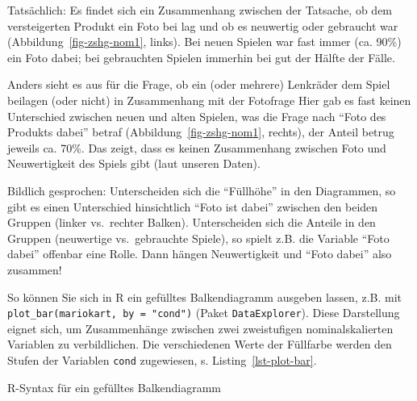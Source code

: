 \documentclass[
  letterpaper,
  twoside,
  open=any]{scrbook}
\newenvironment{Shaded}{\begin{snugshade}}{\end{snugshade}}
\newcommand{\AttributeTok}[1]{\textcolor[rgb]{0.40,0.45,0.13}{#1}}
\newcommand{\CommentTok}[1]{\textcolor[rgb]{0.37,0.37,0.37}{#1}}
\newcommand{\FunctionTok}[1]{\textcolor[rgb]{0.28,0.35,0.67}{#1}}
\newcommand{\NormalTok}[1]{\textcolor[rgb]{0.00,0.23,0.31}{#1}}
\newcommand{\SpecialCharTok}[1]{\textcolor[rgb]{0.37,0.37,0.37}{#1}}
\newcommand{\StringTok}[1]{\textcolor[rgb]{0.13,0.47,0.30}{#1}}
\theoremstyle{definition}
\theoremstyle{definition}
\theoremstyle{definition}
\theoremstyle{remark}
\begin{document}
Tatsächlich: Es findet sich ein Zusammenhang zwischen der Tatsache, ob
dem versteigerten Produkt ein Foto bei lag und ob es neuwertig oder
gebraucht war (Abbildung~\ref{fig-zshg-nom1}, links). Bei neuen Spielen
war fast immer (ca. 90\%) ein Foto dabei; bei gebrauchten Spielen
immerhin bei gut der Hälfte der Fälle.

Anders sieht es aus für die Frage, ob ein (oder mehrere) Lenkräder dem
Spiel beilagen (oder nicht) in Zusammenhang mit der Fotofrage Hier gab
es fast keinen Unterschied zwischen neuen und alten Spielen, was die
Frage nach \enquote{Foto des Produkts dabei} betraf
(Abbildung~\ref{fig-zshg-nom1}, rechts), der Anteil betrug jeweils ca.
70\%. Das zeigt, dass es keinen Zusammenhang zwischen Foto und
Neuwertigkeit des Spiels gibt (laut unseren Daten).

Bildlich gesprochen: Unterscheiden sich die \enquote{Füllhöhe} in den
Diagrammen, so gibt es einen Unterschied hinsichtlich \enquote{Foto ist
dabei} zwischen den beiden Gruppen (linker vs.~rechter Balken).
Unterscheiden sich die Anteile in den Gruppen (neuwertige vs.~gebrauchte
Spiele), so spielt z.B. die Variable \enquote{Foto dabei} offenbar eine
Rolle. Dann hängen Neuwertigkeit und \enquote{Foto dabei} also zusammen!

So können Sie sich in R ein gefülltes Balkendiagramm ausgeben lassen,
z.B. mit \texttt{plot\_bar(mariokart,\ by\ =\ "cond")} (Paket
\texttt{DataExplorer}). Diese Darstellung eignet sich, um Zusammenhänge
zwischen zwei zweistufigen nominalskalierten Variablen zu verbildlichen.
Die verschiedenen Werte der Füllfarbe werden den Stufen der Variablen
\texttt{cond} zugewiesen, s. Listing~\ref{lst-plot-bar}.

\begin{codelisting}

\caption{\label{lst-plot-bar}R-Syntax für ein gefülltes Balkendiagramm}

\centering{

\begin{Shaded}
\begin{Highlighting}[]
\NormalTok{mariokart }\SpecialCharTok{\%\textgreater{}\%} 
  \FunctionTok{select}\NormalTok{(cond, stock\_photo) }\SpecialCharTok{\%\textgreater{}\%} 
  \FunctionTok{plot\_bar}\NormalTok{(}\AttributeTok{by =} \StringTok{"cond"}\NormalTok{)  }\CommentTok{\# aus dem Paket DataExplorer}
\end{Highlighting}
\end{Shaded}

}

\end{codelisting}%
\end{document}
